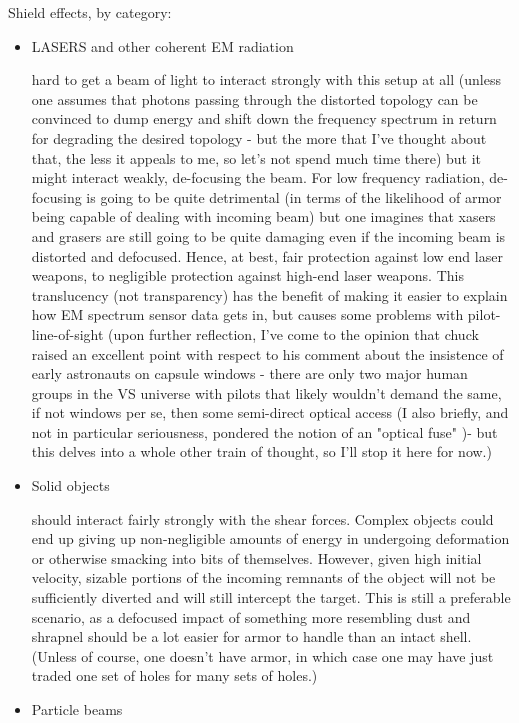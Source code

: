 Shield effects, by category:
\begin{itemize}
\item LASERS and other coherent EM radiation 

hard to get a beam of light to interact strongly with this setup at
all (unless one assumes that photons passing through the distorted
topology can be convinced to dump energy and shift down the frequency
spectrum in return for degrading the desired topology - but the more
that I've thought about that, the less it appeals to me, so let's not
spend much time there) but it might interact weakly, de-focusing the
beam. For low frequency radiation, de-focusing is going to be quite
detrimental (in terms of the likelihood of armor being capable of
dealing with incoming beam) but one imagines that xasers and grasers
are still going to be quite damaging even if the incoming beam is
distorted and defocused. Hence, at best, fair protection against low
end laser weapons, to negligible protection against high-end laser
weapons. This translucency (not transparency) has the benefit of making
it easier to explain how EM spectrum sensor data gets in, but causes
some problems with pilot-line-of-sight (upon further reflection, I've
come to the opinion that chuck raised an excellent point with respect
to his comment about the insistence of early astronauts on capsule
windows - there are only two major human groups in the VS universe
with pilots that likely wouldn't demand the same, if not windows per
se, then some semi-direct optical access (I also briefly, and not in
particular seriousness, pondered the notion of an "optical fuse" )-
but this delves into a whole other train of thought, so I'll stop it
here for now.)

\item Solid objects

should interact fairly strongly with the shear forces. Complex objects
could end up giving up non-negligible amounts of energy in undergoing
deformation or otherwise smacking into bits of themselves. However,
given high initial velocity, sizable portions of the incoming
remnants of the object will not be sufficiently diverted and will
still intercept the target. This is still a preferable scenario, as a
defocused impact of something more resembling dust and shrapnel should
be a lot easier for armor to handle than an intact shell. (Unless of
course, one doesn't have armor, in which case one may have just traded
one set of holes for many sets of holes.)

\item Particle beams


\end{itemize}
